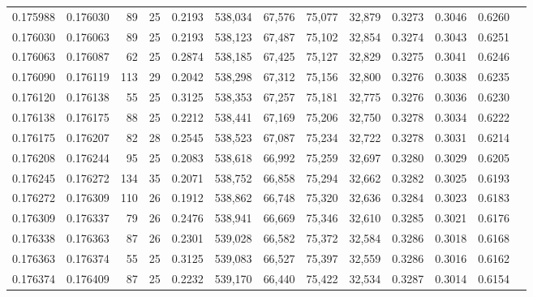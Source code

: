 \begin{tabular}{rrrrrrrrrrrrr}
0.175988 & 0.176030 &  89 &  25 &                                     0.2193 & 538,034 &  67,576 &  75,077 &  32,879 & 0.3273 & 0.3046 & 0.6260 \\
0.176030 & 0.176063 &  89 &  25 &                                     0.2193 & 538,123 &  67,487 &  75,102 &  32,854 & 0.3274 & 0.3043 & 0.6251 \\
0.176063 & 0.176087 &  62 &  25 &                                     0.2874 & 538,185 &  67,425 &  75,127 &  32,829 & 0.3275 & 0.3041 & 0.6246 \\
0.176090 & 0.176119 & 113 &  29 &                                     0.2042 & 538,298 &  67,312 &  75,156 &  32,800 & 0.3276 & 0.3038 & 0.6235 \\
0.176120 & 0.176138 &  55 &  25 &                                     0.3125 & 538,353 &  67,257 &  75,181 &  32,775 & 0.3276 & 0.3036 & 0.6230 \\
0.176138 & 0.176175 &  88 &  25 &                                     0.2212 & 538,441 &  67,169 &  75,206 &  32,750 & 0.3278 & 0.3034 & 0.6222 \\
0.176175 & 0.176207 &  82 &  28 &                                     0.2545 & 538,523 &  67,087 &  75,234 &  32,722 & 0.3278 & 0.3031 & 0.6214 \\
0.176208 & 0.176244 &  95 &  25 &                                     0.2083 & 538,618 &  66,992 &  75,259 &  32,697 & 0.3280 & 0.3029 & 0.6205 \\
0.176245 & 0.176272 & 134 &  35 &                                     0.2071 & 538,752 &  66,858 &  75,294 &  32,662 & 0.3282 & 0.3025 & 0.6193 \\
0.176272 & 0.176309 & 110 &  26 &                                     0.1912 & 538,862 &  66,748 &  75,320 &  32,636 & 0.3284 & 0.3023 & 0.6183 \\
0.176309 & 0.176337 &  79 &  26 &                                     0.2476 & 538,941 &  66,669 &  75,346 &  32,610 & 0.3285 & 0.3021 & 0.6176 \\
0.176338 & 0.176363 &  87 &  26 &                                     0.2301 & 539,028 &  66,582 &  75,372 &  32,584 & 0.3286 & 0.3018 & 0.6168 \\
0.176363 & 0.176374 &  55 &  25 &                                     0.3125 & 539,083 &  66,527 &  75,397 &  32,559 & 0.3286 & 0.3016 & 0.6162 \\
0.176374 & 0.176409 &  87 &  25 &                                     0.2232 & 539,170 &  66,440 &  75,422 &  32,534 & 0.3287 & 0.3014 & 0.6154 \\

\end{tabular}
